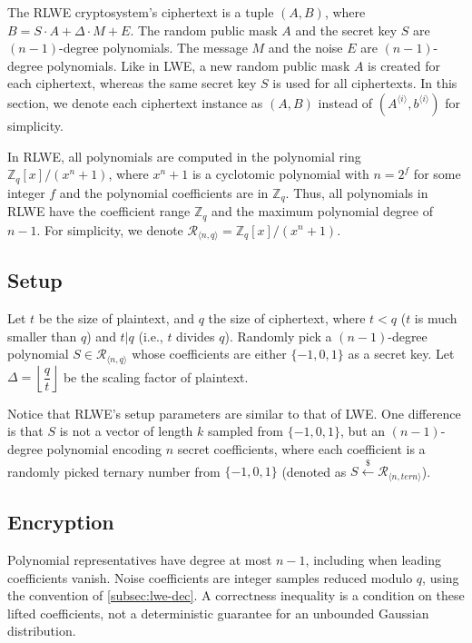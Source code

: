 The RLWE cryptosystem's ciphertext is a tuple $(A, B)$, where $B = S \cdot A + \Delta \cdot M + E$. The random public mask $A$ and the secret key $S$ are $(n-1)$-degree polynomials. The message $M$ and the noise $E$ are $(n-1)$-degree polynomials. Like in LWE, a new random public mask $A$ is created for each ciphertext, whereas the same secret key $S$ is used for all ciphertexts. In this section, we denote each ciphertext instance as $(A, B)$ instead of $(A^{\langle i \rangle}, b^{\langle i \rangle})$ for simplicity.

In RLWE, all polynomials are computed in the polynomial ring $\mathbb{Z}_q[x] / (x^n + 1)$, where $x^n + 1$ is a cyclotomic polynomial with $n = 2^f$ for some integer $f$ and the polynomial coefficients are in $\mathbb{Z}_q$. Thus, all polynomials in RLWE have the coefficient range $\mathbb{Z}_q$ and the maximum polynomial degree of $n -1$. For simplicity, we denote $\mathcal{R}_{\langle n,q \rangle} = \mathbb{Z}_q[x] / (x^n + 1)$.

\subsection{Setup}

Let $t$ be the size of plaintext, and $q$ the size of ciphertext, where $t < q$ ($t$ is much smaller than $q$) and $t | q$ (i.e., $t$ divides $q$). Randomly pick a $(n-1)$-degree polynomial $S \in \mathcal{R}_{\langle n, q \rangle}$ whose coefficients are either $\{-1, 0, 1\}$ as a secret key. Let $\Delta = \left\lfloor\dfrac{q}{t}\right\rfloor$ be the scaling factor of plaintext.

Notice that RLWE's setup parameters are similar to that of LWE. One difference is that $S$ is not a vector of length $k$ sampled from $\{-1, 0, 1\}$, but an $(n-1)$-degree polynomial encoding $n$ secret coefficients, where each coefficient is a randomly picked ternary number from $\{-1, 0, 1\}$ (denoted as $S \xleftarrow{\$} \mathcal{R}_{\langle n, \textit{tern} \rangle}$).


\subsection{Encryption}
\label{subsec:rlwe-enc}

Polynomial representatives have degree at most $n-1$, including when leading coefficients vanish. Noise coefficients are integer samples reduced modulo $q$, using the convention of \autoref{subsec:lwe-dec}. A correctness inequality is a condition on these lifted coefficients, not a deterministic guarantee for an unbounded Gaussian distribution.

